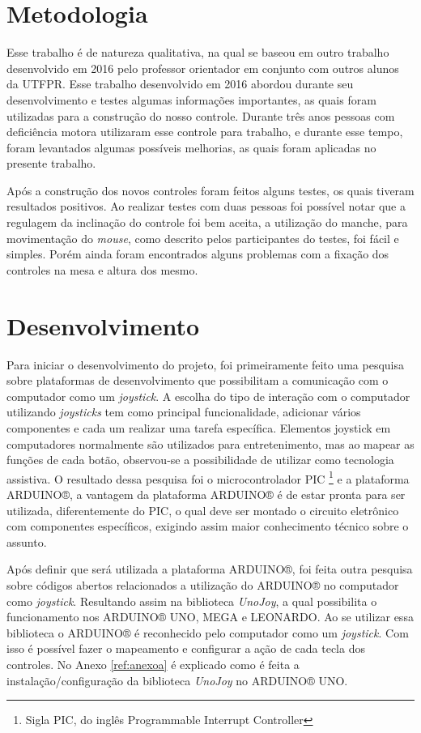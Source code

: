 \documentclass[
	12pt,			%
	openright,		%
	oneside,			%
	a4paper,			%
	chapter=TITLE,		%
	english,			%
	brazil,			%
	]{abntex2}
\begin{document}
\chapter{Metodologia}
\label{met}

Esse trabalho é de natureza qualitativa, na qual se baseou em outro trabalho desenvolvido em 2016 pelo professor orientador em conjunto com outros alunos da UTFPR. Esse trabalho desenvolvido em 2016 abordou durante seu desenvolvimento e testes algumas informações importantes, as quais foram utilizadas para a construção do nosso controle. Durante três anos pessoas com deficiência motora utilizaram esse controle para trabalho, e durante esse tempo, foram levantados algumas possíveis melhorias, as quais foram aplicadas no presente trabalho.

Após a construção dos novos controles foram feitos alguns testes, os quais tiveram resultados positivos. Ao realizar testes com duas pessoas foi possível notar que a regulagem da inclinação do controle foi bem aceita, a utilização do manche, para movimentação do \emph{mouse}, como descrito pelos participantes do testes, foi fácil e simples. Porém ainda foram encontrados alguns problemas com a fixação dos controles na mesa e altura dos mesmo.

\chapter{Desenvolvimento}
\label{des}

Para iniciar o desenvolvimento do projeto, foi primeiramente feito uma pesquisa sobre plataformas de desenvolvimento que possibilitam a comunicação com o computador como um \emph{joystick}. A escolha do tipo de interação com o computador utilizando \emph{joysticks} tem como principal funcionalidade, adicionar vários componentes e cada um realizar uma tarefa específica. Elementos joystick em computadores normalmente são utilizados para entretenimento, mas ao mapear as funções de cada botão, observou-se a possibilidade de utilizar como tecnologia assistiva. O resultado dessa pesquisa foi o microcontrolador PIC \footnote{Sigla PIC, do inglês Programmable Interrupt Controller} e a plataforma ARDUINO®, a vantagem da plataforma ARDUINO® é de estar pronta para ser utilizada, diferentemente do PIC, o qual deve ser montado o circuito eletrônico com componentes específicos, exigindo assim maior conhecimento técnico sobre o assunto.

Após definir que será utilizada a plataforma ARDUINO®, foi feita outra pesquisa sobre códigos abertos relacionados a utilização do ARDUINO® no computador como \emph{joystick}. Resultando assim na biblioteca \emph{UnoJoy}, a qual possibilita o funcionamento nos ARDUINO® UNO, MEGA e LEONARDO. Ao se utilizar essa biblioteca o ARDUINO® é reconhecido pelo computador como um \emph{joystick}. Com isso é possível fazer o mapeamento e configurar a ação de cada tecla dos controles. No Anexo \ref{ref:anexoa} é explicado como é feita a instalação/configuração da biblioteca \emph{UnoJoy} no ARDUINO® UNO.
\end{document}
